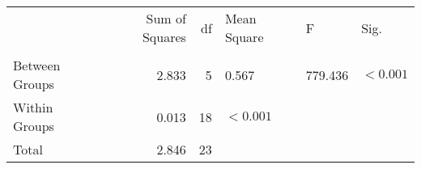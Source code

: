 \begin{tabular}{lrrlll}
\toprule
 & Sum of Squares & df & Mean Square & F & Sig. \\
 &  &  &  &  &  \\
\midrule
Between Groups & 2.833 & 5 & 0.567 & 779.436 & $< 0.001$ \\
Within Groups & 0.013 & 18 & $< 0.001$ &  &  \\
Total & 2.846 & 23 &  &  &  \\
\bottomrule
\end{tabular}
